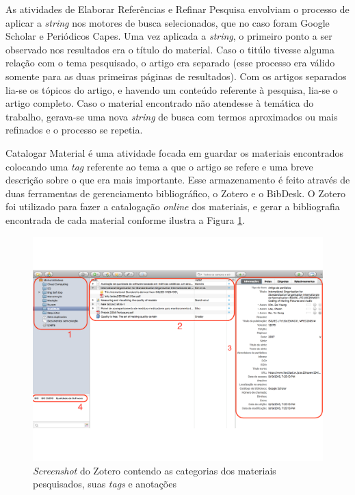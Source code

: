As atividades de Elaborar Referências e Refinar Pesquisa envolviam o processo de aplicar a \textit{string} nos motores de busca selecionados, que no caso foram Google Scholar e Periódicos Capes. Uma vez aplicada a \textit{string}, o primeiro ponto a ser observado nos resultados era o título do material. Caso o titúlo tivesse alguma relação com o tema pesquisado, o artigo era separado (esse processo era válido somente para as duas primeiras páginas de resultados). Com os artigos separados lia-se os tópicos do artigo, e havendo um conteúdo referente à pesquisa, lia-se o artigo completo. Caso o  material encontrado não atendesse à temática do trabalho, gerava-se uma nova \textit{string} de busca com termos aproximados ou mais refinados e o processo se repetia.

Catalogar Material é uma atividade focada em guardar os materiais encontrados colocando uma  \textit{tag} referente ao tema a que o artigo se refere e uma breve descrição sobre o que era mais importante. Esse armazenamento é feito através de duas ferramentas de gerenciamento bibliográfico, o Zotero e o BibDesk. O Zotero foi utilizado para fazer a catalogação \textit{online} dos materiais, e gerar a bibliografia encontrada de cada material conforme ilustra a Figura \ref{img:zotero}.

\graphicspath{{figuras/}}
\begin{figure}[h!]
\centering
\includegraphics[scale=0.50]{zotero_edit2}
\caption{\textit{Screenshot} do Zotero contendo as categorias dos materiais pesquisados, suas \textit{tags} e anotações}
\label{img:zotero}
\end{figure}

